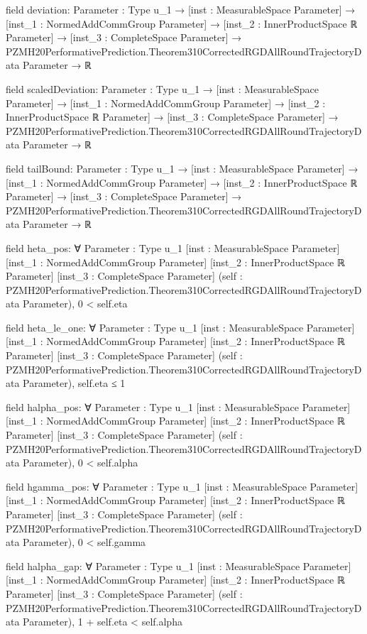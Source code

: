 \documentclass[10pt]{article}
\begin{document}
\begin{ReviewVerbatim}
field deviation:
{Parameter : Type u_1} →
  [inst : MeasurableSpace Parameter] →
    [inst_1 : NormedAddCommGroup Parameter] →
      [inst_2 : InnerProductSpace ℝ Parameter] →
        [inst_3 : CompleteSpace Parameter] →
          PZMH20PerformativePrediction.Theorem310CorrectedRGDAllRoundTrajectoryData Parameter → ℝ

field scaledDeviation:
{Parameter : Type u_1} →
  [inst : MeasurableSpace Parameter] →
    [inst_1 : NormedAddCommGroup Parameter] →
      [inst_2 : InnerProductSpace ℝ Parameter] →
        [inst_3 : CompleteSpace Parameter] →
          PZMH20PerformativePrediction.Theorem310CorrectedRGDAllRoundTrajectoryData Parameter → ℝ

field tailBound:
{Parameter : Type u_1} →
  [inst : MeasurableSpace Parameter] →
    [inst_1 : NormedAddCommGroup Parameter] →
      [inst_2 : InnerProductSpace ℝ Parameter] →
        [inst_3 : CompleteSpace Parameter] →
          PZMH20PerformativePrediction.Theorem310CorrectedRGDAllRoundTrajectoryData Parameter → ℝ

field heta_pos:
∀ {Parameter : Type u_1} [inst : MeasurableSpace Parameter] [inst_1 : NormedAddCommGroup Parameter]
  [inst_2 : InnerProductSpace ℝ Parameter] [inst_3 : CompleteSpace Parameter]
  (self : PZMH20PerformativePrediction.Theorem310CorrectedRGDAllRoundTrajectoryData Parameter), 0 < self.eta

field heta_le_one:
∀ {Parameter : Type u_1} [inst : MeasurableSpace Parameter] [inst_1 : NormedAddCommGroup Parameter]
  [inst_2 : InnerProductSpace ℝ Parameter] [inst_3 : CompleteSpace Parameter]
  (self : PZMH20PerformativePrediction.Theorem310CorrectedRGDAllRoundTrajectoryData Parameter), self.eta ≤ 1

field halpha_pos:
∀ {Parameter : Type u_1} [inst : MeasurableSpace Parameter] [inst_1 : NormedAddCommGroup Parameter]
  [inst_2 : InnerProductSpace ℝ Parameter] [inst_3 : CompleteSpace Parameter]
  (self : PZMH20PerformativePrediction.Theorem310CorrectedRGDAllRoundTrajectoryData Parameter), 0 < self.alpha

field hgamma_pos:
∀ {Parameter : Type u_1} [inst : MeasurableSpace Parameter] [inst_1 : NormedAddCommGroup Parameter]
  [inst_2 : InnerProductSpace ℝ Parameter] [inst_3 : CompleteSpace Parameter]
  (self : PZMH20PerformativePrediction.Theorem310CorrectedRGDAllRoundTrajectoryData Parameter), 0 < self.gamma

field halpha_gap:
∀ {Parameter : Type u_1} [inst : MeasurableSpace Parameter] [inst_1 : NormedAddCommGroup Parameter]
  [inst_2 : InnerProductSpace ℝ Parameter] [inst_3 : CompleteSpace Parameter]
  (self : PZMH20PerformativePrediction.Theorem310CorrectedRGDAllRoundTrajectoryData Parameter),
  1 + self.eta < self.alpha


\end{ReviewVerbatim}
\end{document}
